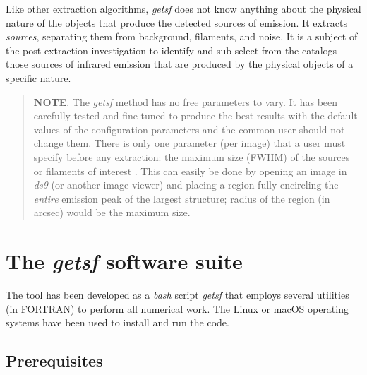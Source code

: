 \documentclass[a4paper,10pt]{article}
\begin{document}
Like other extraction algorithms, \textsl{getsf} does not know anything about the physical nature of the objects that produce the
detected sources of emission. It extracts \emph{sources}, separating them from background, filaments, and noise. It is a subject of
the post-extraction investigation to identify and sub-select from the catalogs those sources of infrared emission that are produced
by the physical objects of a specific nature.
     
\begin{quote} %
\textbf{NOTE}. The \textsl{getsf} method has no free parameters to vary. It has been carefully tested and fine-tuned to produce the
best results with the default values of the configuration parameters and the common user should not change them. There is only one
parameter (per image) that a user must specify before any extraction: the maximum size (FWHM) of the sources or filaments of
interest \citep[see Sect.~3.1.3 in][]{Men'shchikov2021getsf}. This can easily be done by opening an image in \textsl{ds9} (or 
another image viewer) and placing a region fully encircling the \emph{entire} emission peak of the largest structure; radius of the 
region (in arcsec) would be the maximum size.
\end{quote} %


\section{The \textsl{getsf} software suite}
\label{software}

The tool has been developed as a \textsl{bash} script \textsl{getsf} that employs several utilities (in FORTRAN) to perform all
numerical work. The Linux or macOS operating systems have been used to install and run the code.


\subsection{Prerequisites}
\label{prerequisites}
\end{document}
